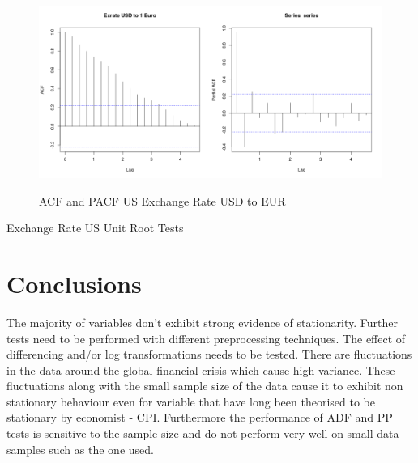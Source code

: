 \documentclass[10pt]{article}
\begin{document}
\begin{figure}[h!]
\centering
\includegraphics[width = 0.5\textwidth]{"../acf/us_Exrate USD to 1 Euro"}\includegraphics[width = 0.5\textwidth]{"../pacf/us_Exrate USD to 1 Euro"}
\caption{ACF and PACF US Exchange Rate USD to EUR}
\label{fig:us_exrateUSDtoEUR_acf}
\end{figure}

\begin{table}[h!]
\centering
{}
\caption{Exchange Rate US Unit Root Tests}
\label{table:us_exrate}
\end{table}

\pagebreak

\section{Conclusions}
\label{sec:conclusions}
The majority of variables don't exhibit strong evidence of stationarity. Further tests need to be performed with different preprocessing techniques. The effect of differencing and/or log transformations needs to be tested. There are fluctuations in the data around the global financial crisis which cause high variance. These fluctuations along with the small sample size of the data cause it to exhibit non stationary behaviour even for variable that have long been theorised to be stationary by economist - CPI. Furthermore the performance of ADF and PP tests is sensitive to the sample size and do not perform very well on small data samples such as the one used.
\end{document}
